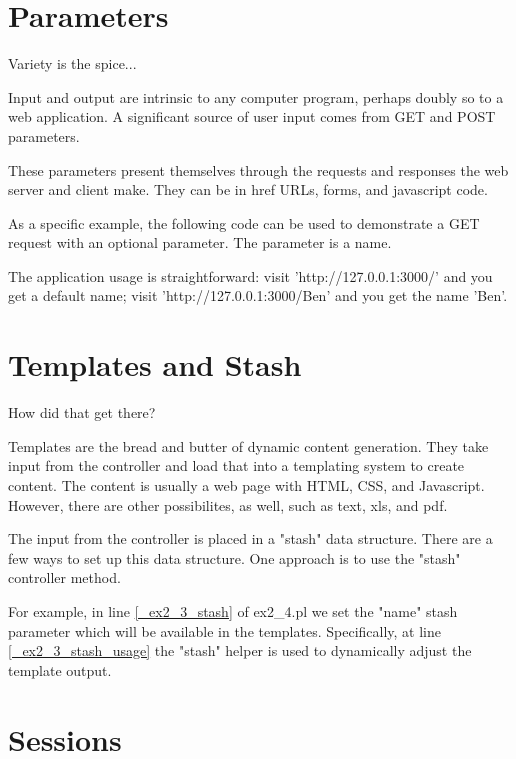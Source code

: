 \documentclass[14pt]{extreport}
\begin{document}
\section{Parameters}

{\Large Variety is the spice...}

Input and output are intrinsic to any computer program, perhaps doubly so to a
web application.  A significant source of user input comes from GET and POST
parameters.

These parameters present themselves through the requests and responses the web
server and client make.  They can be in href URLs, forms, and javascript code.

As a specific example, the following code can be used to demonstrate a GET
request with an optional parameter.  The parameter is a name.



The application usage is straightforward: visit 'http://127.0.0.1:3000/' and
you get a default name; visit 'http://127.0.0.1:3000/Ben' and you get the name
'Ben'.

\section{Templates and Stash}

{\Large How did that get there?}

Templates are the bread and butter of dynamic content generation.  They take
input from the controller and load that into a templating system to create
content.  The content is usually a web page with HTML, CSS, and Javascript.
However, there are other possibilites, as well, such as text, xls, and pdf.

The input from the controller is placed in a "stash" data structure.  There are
a few ways to set up this data structure.  One approach is to use the "stash"
controller method.



For example, in line \ref{_ex2_3_stash} of ex2\_4.pl we set the "name" stash 
parameter which will be available in the templates.  Specifically, at line 
\ref{_ex2_3_stash_usage} the "stash" helper is used to dynamically adjust
the template output.

\section{Sessions}
\end{document}
